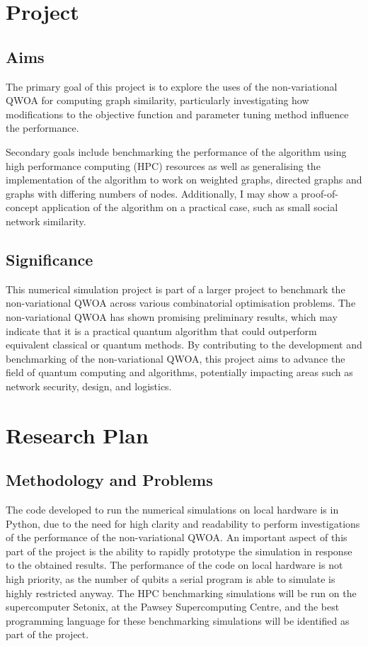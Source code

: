 \section{Project}
\subsection{Aims}
The primary goal of this project is to explore the uses of the non-variational QWOA for computing graph similarity, particularly investigating how modifications to the objective function and parameter tuning method influence the performance.

Secondary goals include benchmarking the performance of the algorithm using high performance computing (HPC) resources as well as generalising the implementation of the algorithm to work on weighted graphs, directed graphs and graphs with differing numbers of nodes. Additionally, I may show a proof-of-concept application of the algorithm on a practical case, such as small social network similarity.

\subsection{Significance}
This numerical simulation project is part of a larger project to benchmark the non-variational QWOA across various combinatorial optimisation problems. The non-variational QWOA has shown promising preliminary results, which may indicate that it is a practical quantum algorithm that could outperform equivalent classical or quantum methods. By contributing to the development and benchmarking of the non-variational QWOA, this project aims to advance the field of quantum computing and algorithms, potentially impacting areas such as network security, design, and logistics.

\section{Research Plan}
\subsection{Methodology and Problems}
The code developed to run the numerical simulations on local hardware is in Python, due to the need for high clarity and readability to perform investigations of the performance of the non-variational QWOA. An important aspect of this part of the project is the ability to rapidly prototype the simulation in response to the obtained results. The performance of the code on local hardware is not high priority, as the number of qubits a serial program is able to simulate is highly restricted anyway. The HPC benchmarking simulations will be run on the supercomputer Setonix, at the Pawsey Supercomputing Centre, and the best programming language for these benchmarking simulations will be identified as part of the project.

